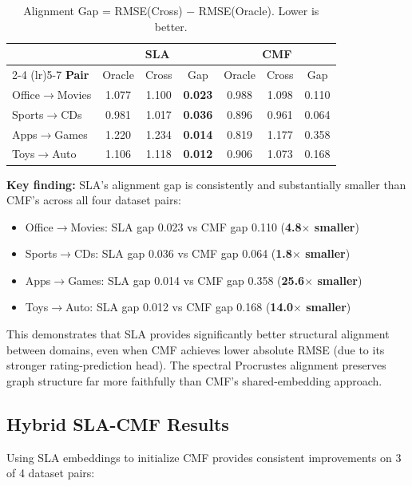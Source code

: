 \documentclass[conference]{IEEEtran}
\begin{document}
\begin{table}[h]
\centering
\caption{Alignment Gap = RMSE(Cross) $-$ RMSE(Oracle). Lower is better.}
\label{tab:gap}
\begin{tabular}{lccc|ccc}
\toprule
& \multicolumn{3}{c}{\textbf{SLA}} & \multicolumn{3}{c}{\textbf{CMF}} \\
\cmidrule(lr){2-4} \cmidrule(lr){5-7}
\textbf{Pair} & Oracle & Cross & Gap & Oracle & Cross & Gap \\
\midrule
Office$\to$Movies & 1.077 & 1.100 & \textbf{0.023} & 0.988 & 1.098 & 0.110 \\
Sports$\to$CDs & 0.981 & 1.017 & \textbf{0.036} & 0.896 & 0.961 & 0.064 \\
Apps$\to$Games & 1.220 & 1.234 & \textbf{0.014} & 0.819 & 1.177 & 0.358 \\
Toys$\to$Auto & 1.106 & 1.118 & \textbf{0.012} & 0.906 & 1.073 & 0.168 \\
\bottomrule
\end{tabular}
\end{table}

\textbf{Key finding:} SLA's alignment gap is consistently and substantially smaller than CMF's across all four dataset pairs:
\begin{itemize}
    \item Office$\to$Movies: SLA gap 0.023 vs CMF gap 0.110 (\textbf{4.8$\times$ smaller})
    \item Sports$\to$CDs: SLA gap 0.036 vs CMF gap 0.064 (\textbf{1.8$\times$ smaller})
    \item Apps$\to$Games: SLA gap 0.014 vs CMF gap 0.358 (\textbf{25.6$\times$ smaller})
    \item Toys$\to$Auto: SLA gap 0.012 vs CMF gap 0.168 (\textbf{14.0$\times$ smaller})
\end{itemize}

This demonstrates that SLA provides significantly better structural alignment between domains, even when CMF achieves lower absolute RMSE (due to its stronger rating-prediction head). The spectral Procrustes alignment preserves graph structure far more faithfully than CMF's shared-embedding approach.

\subsection{Hybrid SLA-CMF Results}

Using SLA embeddings to initialize CMF provides consistent improvements on 3 of 4 dataset pairs:
\end{document}
